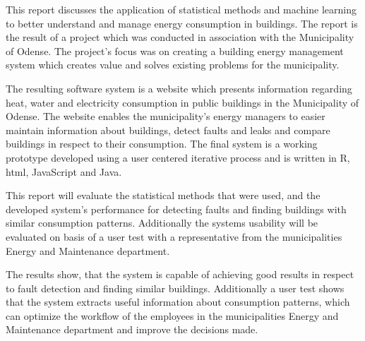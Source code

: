 This report discusses the application of statistical methods and machine learning  to better understand and manage energy consumption in buildings. The report is the result of a project which was conducted  in association with the Municipality of Odense. The project’s focus was on creating a building energy management system which creates value and solves existing problems for the municipality.

The  resulting software system is a website  which presents information regarding  heat, water and electricity consumption in public buildings in the Municipality of Odense. The website enables the municipality's energy managers to easier maintain information about buildings, detect faults and leaks and compare buildings in respect to their consumption. The final system is a working prototype developed using a user centered iterative process and is written in R, html, JavaScript and Java.

This report will evaluate the statistical methods that were used, and the developed system’s performance for detecting faults and finding buildings with similar consumption patterns. Additionally the systems usability will be evaluated on basis of a user test with a representative from the municipalities Energy and Maintenance department.

The results show, that the system is capable of achieving good results in respect to fault detection and finding similar buildings. Additionally a user test shows that the system extracts useful information about consumption patterns, which can optimize the workflow of the employees in the municipalities Energy and Maintenance department and improve the decisions made.